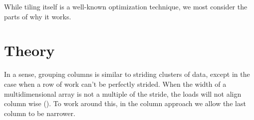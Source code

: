 
While tiling itself is a well-known optimization technique, we most consider the parts of why it works.

\TODO{\dots}

\section{Theory}
\label{sec:implementation_theory}

In a sense, grouping columns is similar to striding clusters of data, except in the case when a row of work can't be perfectly strided.
When the width of a multidimensional array is not a multiple of the stride, the loads will not align column wise ().
To work around this, in the column approach we allow the last column to be narrower.

